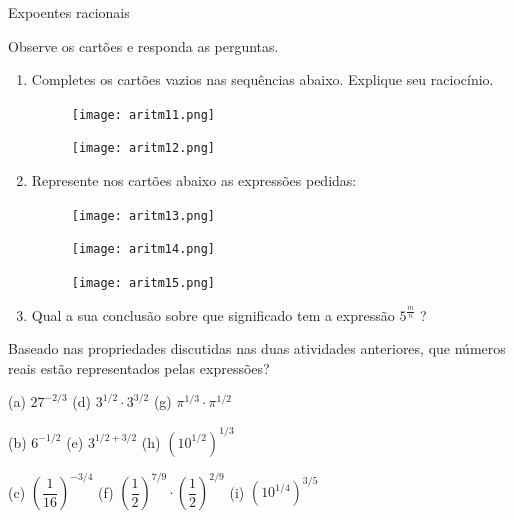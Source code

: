 \begin{task}{Expoentes racionais}

Observe os cartões e responda as perguntas.

\begin{enumerate}

\item{}
Completes os cartões vazios nas sequências abaixo. Explique seu raciocínio.

\begin{figure}[H]
\centering
\texttt{[image: aritm11.png]}
\end{figure}


\begin{figure}[H]
\centering
\texttt{[image: aritm12.png]}
\end{figure}

\item{}
Represente nos cartões abaixo as expressões pedidas:

\begin{figure}[H]
\centering
\texttt{[image: aritm13.png]}
\end{figure}

\begin{figure}[H]
\centering
\texttt{[image: aritm14.png]}
\end{figure}

\begin{figure}[H]
\centering
\texttt{[image: aritm15.png]}
\end{figure}

\item{}
Qual a sua conclusão sobre que significado tem a expressão $5^{\frac{m}{n}}$ ?

\end{enumerate}

\end{task}

\begin{reflection}

Baseado nas propriedades discutidas nas duas atividades anteriores, que números reais estão representados pelas expressões?

 (a) $27^{-2/3}$  \hspace{1,5cm} (d) $3^{1/2}\cdot 3^{3/2}$ \hspace{1,5cm} (g) $\pi^{1/3} \cdot \pi^{1/2}$

 (b) $6^{-1/2}$   \hspace{1,7cm} (e) $3^{1/2+3/2}$  \hspace{1,7cm} (h) $(10^{1/2})^{1/3}$

 (c) $\left( \dfrac{1}{16}\right)^{-3/4}$  \hspace{1,0cm} (f) $\left( \dfrac{1}{2}\right)^{7/9} \cdot \left( \dfrac{1}{2}\right)^{2/9}$  \hspace{0,3cm} (i) $(10^{1/4})^{3/5}$

\end{reflection}

